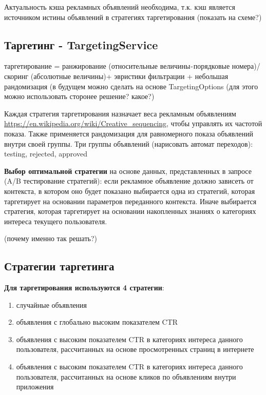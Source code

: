 \documentclass[times]{itmo-student-thesis}
\begin{document}
Актуальность кэша рекламных объявлений необходима, т.к. кэш является источником истины объявлений в стратегиях таргетирования (показать на схеме?)

\subsection{Таргетинг - TargetingService}

таргетирование = ранжирование (относительные величины - порядковые номера)/ скоринг (абсолютные величины)+ эвристики фильтрации + небольшая рандомизация (в будущем можно сделать на основе TargetingOptions (для этого можно использовать сторонее решение? какое?)

Каждая стратегия таргетирования назначает веса рекламным объявлениям \url{https://en.wikipedia.org/wiki/Creative_sequencing}, чтобы управлять их частотой показа. Также применяется рандомизация для равномерного показа объявлений внутри своей группы. Три группы объявлений (нарисовать автомат переходов): testing, rejected, approved

\textbf{Выбор оптимальной стратегии} на основе данных, представленных в запросе (A/B тестирование стратегий): если рекламное объявление должно зависеть от контекста, в котором оно будет показано выбирается одна из стратегий, которая таргетирует на основании параметров переданного контекста. Иначе выбирается стратегия, которая таргетирует на основании накопленных знаниях о категориях интереса текущего пользователя.

(почему именно так решать?)

\subsection{Стратегии таргетинга}

\textbf{Для таргетирования используются 4 стратегии}:
\begin{enumerate}
	\item случайные объявления
	\item объявления с глобально высоким показателем CTR
	\item объявления с высоким показателем CTR в категориях интереса данного пользователя, рассчитанных на основе просмотренных страниц в интернете
	\item объявления с высоким показателем CTR в категориях интереса данного пользователя, рассчитанных на основе кликов по объявлениям внутри приложения
\end{enumerate}
\end{document}
